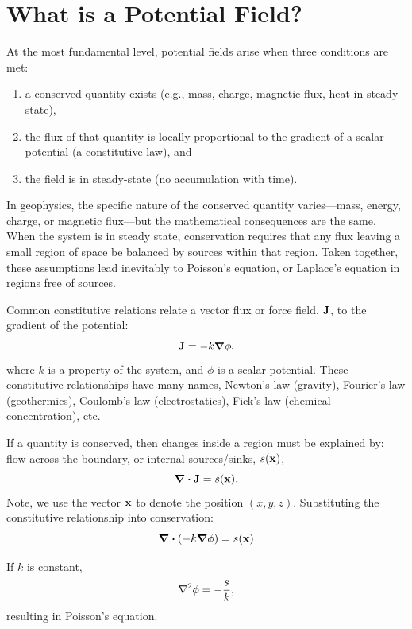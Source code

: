 \section{What is a Potential Field?}
At the most fundamental level, potential fields arise when three conditions are met:
\begin{enumerate}
    \item a conserved quantity exists (e.g., mass, charge, magnetic flux, heat in steady-state),
    \item the flux of that quantity is locally proportional to the gradient of a scalar potential (a constitutive law), and
    \item the field is in steady-state (no accumulation with time).
\end{enumerate}
In geophysics, the specific nature of the conserved quantity varies---mass, energy, charge, or magnetic flux---but the mathematical consequences are the same. When the system is in steady state, conservation requires that any flux leaving a small region of space be balanced by sources within that region. Taken together, these assumptions lead inevitably to Poisson's equation, or Laplace's equation in regions free of sources.

Common constitutive relations relate a vector flux or force field, $\vb{J}$, to the gradient of the potential:
\begin{equation}
    \vb{J} = -k \grad \phi,
\end{equation}
where $k$ is a property of the system, and $\phi$ is a scalar potential.  These constitutive relationships have many names, Newton's law (gravity), Fourier's law (geothermics), Coulomb's law (electrostatics), Fick's law (chemical concentration), etc.

If a quantity is conserved, then changes inside a region must be explained by: flow across the boundary, or internal sources/sinks, $s(\vb{x})$,
\begin{equation}
    \div{\vb{J}} = s(\vb{x}).
\end{equation}
Note, we use the vector $\vb{x}$ to denote the position $(x,y,z)$.
Substituting the constitutive relationship into conservation:
\begin{equation}
    \div(-k \grad \phi) = s(\vb{x})
\end{equation}

If $k$ is constant,
\begin{equation}
    \laplacian \phi = -\frac{s}{k}, 
\end{equation}
resulting in Poisson's equation.

